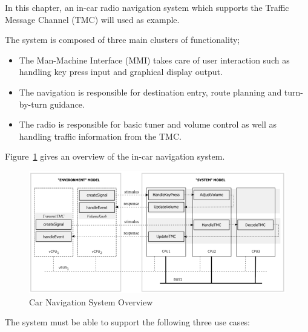 In this chapter, an in-car radio navigation system which supports the Traffic Message Channel (TMC) will used as example. 

The system is composed of three main clusters of functionality; 
\begin{itemize}
\item The Man-Machine Interface (MMI) takes care of user interaction such as handling key press input and graphical display output. 
\item The navigation is responsible for destination entry, route planning and turn-by-turn guidance. 
\item The radio is responsible for basic tuner and volume control as well as handling traffic information from the TMC.
\end{itemize}

Figure~\ref{fig:navigationoverview} gives an overview of the in-car navigation system. 

\begin{figure}[!h]
\begin{center}
  \includegraphics[width=4.5in]{figures/CarNavigationOverview}
  \caption[labelInTOC]{Car Navigation System Overview}
  \label{fig:navigationoverview}
\end{center}
\end{figure}

The system must be able to support the following three use cases:

